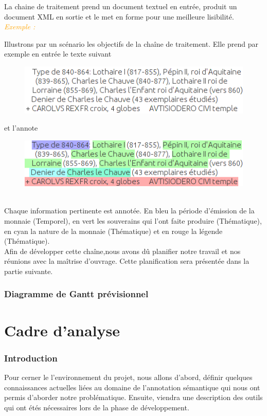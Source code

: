 \documentclass[a4paper, 11pt]{report}
\newenvironment{exemple}
    {
    \textit{\textcolor{orange}{
    Exemple : \\}}
    }
    {\\
    }
\begin{document}
	La chaine de traitement prend un document textuel en entrée, produit un document XML en sortie et le met en forme pour une meilleure lisibilité.\\
	\begin{exemple}
\noindent Illustrons par un scénario les objectifs de la chaîne de traitement.
Elle prend par exemple en entrée le texte suivant

\begin{figure}[h!]
\centering
\includegraphics[scale=.5]{img/exemple_text.png}
\end{figure}

et l'annote
\end{exemple}
\begin{figure}[h!]
\centering
\includegraphics[scale=.5]{img/exemple_text_ann.png} 
\end{figure}\\
Chaque information pertinente est annotée. En bleu la période d'émission de la monnaie (Temporel), en vert les souverains qui l'ont faite produire (Thématique), en cyan la nature de la monnaie (Thématique) et en rouge la légende (Thématique).\\
Afin de développer cette chaîne,nous avons dû planifier notre travail et nos réunions avec la maîtrise d'ouvrage. Cette planification sera présentée dans la partie suivante.

	\section{Diagramme de Gantt prévisionnel}
	
\part{Cadre d'analyse}
\section*{Introduction}
Pour cerner le l'environnement du projet, nous allons d'abord, définir quelques connaissances actuelles liées au domaine de l'annotation sémantique qui nous ont permis d'aborder notre problématique. Ensuite, viendra une description des outils qui ont étés nécessaires lors de la phase de développement.
\end{document}
